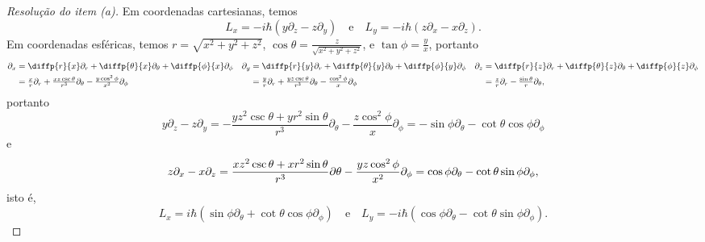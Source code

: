 \begin{proof}[Resolução do item (a)]
    Em coordenadas cartesianas, temos
    \begin{equation*}
        L_x =  -i \hbar \left(y \partial_{z} - z \partial_{y}\right)\quad\text{e}\quad L_y = -i \hbar \left(z\partial_{x} - x \partial_{z}\right).
    \end{equation*}
    Em coordenadas esféricas, temos \(r = \sqrt{x^2 + y^2 + z^2}\), \(\cos\theta = \frac{z}{\sqrt{x^2 + y^2 + z^2}}\), e \(\tan\phi = \frac{y}{x}\), portanto
    \begin{align*}
        \partial_{x} &=\textstyle \diffp{r}{x}\partial_r + \diffp{\theta}{x}\partial_\theta + \diffp{\phi}{x}\partial_\phi&
        \partial_{y} &=\textstyle \diffp{r}{y}\partial_r + \diffp{\theta}{y}\partial_\theta + \diffp{\phi}{y}\partial_\phi&
        \partial_{z} &=\textstyle \diffp{r}{z}\partial_r + \diffp{\theta}{z}\partial_\theta + \diffp{\phi}{z}\partial_\phi\\
                     &=\textstyle \frac{x}{r} \partial_r +  \frac{xz\csc\theta}{r^3} \partial_\theta -  \frac{y\cos^2\phi}{x^2} \partial_\phi&
                     &=\textstyle \frac{y}{r} \partial_r +  \frac{yz\csc\theta}{r^3} \partial_\theta -  \frac{\cos^2\phi}{x} \partial_\phi&
                       &=\textstyle \frac{z}{r}\partial_r - \frac{\sin\theta}{r} \partial_\theta,
    \end{align*}
    portanto
    \begin{equation*}
        y \partial_z - z \partial_y = -\frac{yz^2 \csc\theta + y r^2\sin\theta}{r^3}\partial_\theta - \frac{z \cos^2\phi}{x}\partial_\phi
                                    = -\sin\phi\partial_\theta - \cot\theta \cos\phi \partial_\phi
    \end{equation*}
    e
    \begin{equation*}
        z \partial_x - x \partial_z = \frac{xz^2 \csc\theta + xr^2 \sin\theta}{r^3}\partial\theta - \frac{yz \cos^2\phi}{x^2}\partial_\phi\\
                                    = \cos\phi \partial_\theta- \cot\theta \sin\phi \partial_\phi,
    \end{equation*}
    isto é,
    \begin{equation*}
        L_x = i\hbar \left(\sin\phi \partial_\theta + \cot\theta \cos\phi \partial_\phi\right)\quad\text{e}\quad
        L_y = -i\hbar \left(\cos\phi \partial_\theta- \cot\theta \sin\phi \partial_\phi\right).

\end{equation*}
\end{proof}
